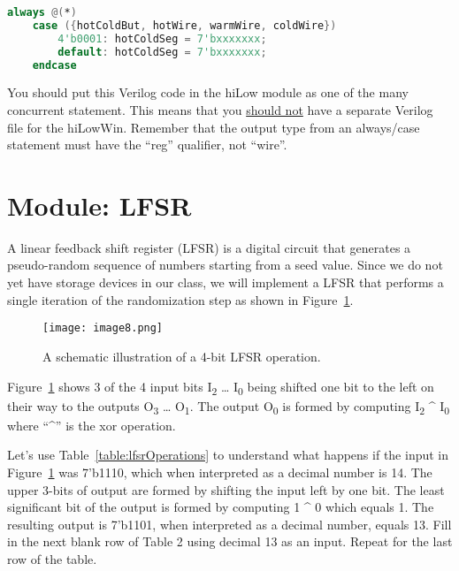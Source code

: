 \begin{lstlisting}[language=Verilog,
 caption={Starter code for the hiLowWin module.},
 label={listing:hiLowWinVerilog},
 frame=single]
 always @(*)
	case ({hotColdBut, hotWire, warmWire, coldWire})            
		4'b0001: hotColdSeg = 7'bxxxxxxx;				
		default: hotColdSeg = 7'bxxxxxxx;
	endcase  
 \end{lstlisting}

You should put this Verilog code in the hiLow module as one of the many
concurrent statement. This means that you \uline{should not} have a
separate Verilog file for the hiLowWin. Remember that the output type
from an always/case statement must have the ``reg'' qualifier, not
``wire''.

\hypertarget{lfsr-module}{%
\section{Module: LFSR}\label{lfsr-module}}

A linear feedback shift register (LFSR) is a digital circuit that
generates a pseudo-random sequence of numbers starting from a seed
value. Since we do not yet have storage devices in our class, we will
implement a LFSR that performs a single iteration of the randomization
step as shown in Figure~\ref{fig:lfsrOperation}.

\begin{figure}[ht]
\texttt{[image: image8.png]}
\caption{A schematic illustration of a 4-bit LFSR operation.}
\label{fig:lfsrOperation}
\end{figure}

Figure~\ref{fig:lfsrOperation} shows 3 of the 4 input bits I\textsubscript{2} \ldots{}
I\textsubscript{0} being shifted one bit to the left on their way to the
outputs O\textsubscript{3} \ldots{} O\textsubscript{1}. The output
O\textsubscript{0} is formed by computing I\textsubscript{2} \^{}
I\textsubscript{0} where ``\^{}'' is the xor operation.

Let's use Table~\ref{table:lfsrOperations} to 
understand what happens if the input in 
Figure~\ref{fig:lfsrOperation}
was 7'b1110, which when interpreted as a decimal number is 14. The upper
3-bits of output are formed by shifting the input left by one bit. The
least significant bit of the output is formed by computing 1 \^{} 0
which equals 1. The resulting output is 7'b1101, when interpreted as a
decimal number, equals 13. Fill in the next blank row of Table 2 using
decimal 13 as an input. Repeat for the last row of the table.

